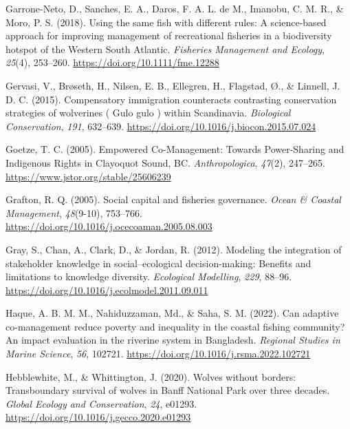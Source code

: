 \documentclass[
  12pt,
]{article}
\newlength{\cslhangindent}
\newenvironment{CSLReferences}[2] %
 {\begin{list}{}{%
  \setlength{\itemindent}{0pt}
  \setlength{\leftmargin}{0pt}
  \setlength{\parsep}{0pt}
  \ifodd #1
   \setlength{\leftmargin}{\cslhangindent}
   \setlength{\itemindent}{-1\cslhangindent}
  \fi
  \setlength{\itemsep}{#2\baselineskip}}}
 {\end{list}}
\begin{document}
\begin{CSLReferences}{1}{2}
Garrone-Neto, D., Sanches, E. A., Daros, F. A. L. de M., Imanobu, C. M. R., \& Moro, P. S. (2018). Using the same fish with different rules: {A} science-based approach for improving management of recreational fisheries in a biodiversity hotspot of the {Western South Atlantic}. \emph{Fisheries Management and Ecology}, \emph{25}(4), 253--260. \url{https://doi.org/10.1111/fme.12288}

Gervasi, V., Brøseth, H., Nilsen, E. B., Ellegren, H., Flagstad, Ø., \& Linnell, J. D. C. (2015). Compensatory immigration counteracts contrasting conservation strategies of wolverines ( {Gulo} gulo ) within {Scandinavia}. \emph{Biological Conservation}, \emph{191}, 632--639. \url{https://doi.org/10.1016/j.biocon.2015.07.024}

Goetze, T. C. (2005). Empowered {Co-Management}: {Towards Power-Sharing} and {Indigenous Rights} in {Clayoquot Sound}, {BC}. \emph{Anthropologica}, \emph{47}(2), 247--265. \url{https://www.jstor.org/stable/25606239}

Grafton, R. Q. (2005). Social capital and fisheries governance. \emph{Ocean \& Coastal Management}, \emph{48}(9-10), 753--766. \url{https://doi.org/10.1016/j.ocecoaman.2005.08.003}

Gray, S., Chan, A., Clark, D., \& Jordan, R. (2012). Modeling the integration of stakeholder knowledge in social--ecological decision-making: {Benefits} and limitations to knowledge diversity. \emph{Ecological Modelling}, \emph{229}, 88--96. \url{https://doi.org/10.1016/j.ecolmodel.2011.09.011}

Haque, A. B. M. M., Nahiduzzaman, Md., \& Saha, S. M. (2022). Can adaptive co-management reduce poverty and inequality in the coastal fishing community? {An} impact evaluation in the riverine system in {Bangladesh}. \emph{Regional Studies in Marine Science}, \emph{56}, 102721. \url{https://doi.org/10.1016/j.rsma.2022.102721}

Hebblewhite, M., \& Whittington, J. (2020). Wolves without borders: {Transboundary} survival of wolves in {Banff National Park} over three decades. \emph{Global Ecology and Conservation}, \emph{24}, e01293. \url{https://doi.org/10.1016/j.gecco.2020.e01293}


\end{CSLReferences}
\end{document}
